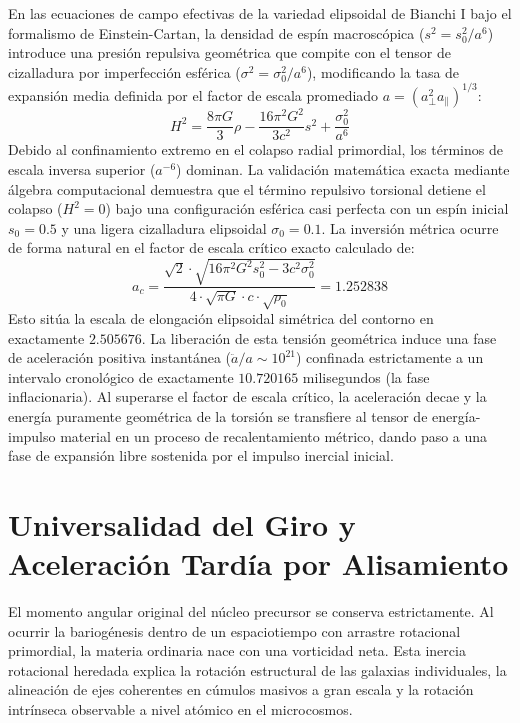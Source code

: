 \documentclass[11pt,a4paper]{article}
\begin{document}
En las ecuaciones de campo efectivas de la variedad elipsoidal de Bianchi I bajo el formalismo de Einstein-Cartan, la densidad de espín macroscópica ($s^2 = s_0^2/a^6$) introduce una presión repulsiva geométrica que compite con el tensor de cizalladura por imperfección esférica ($\sigma^2 = \sigma_0^2/a^6$), modificando la tasa de expansión media definida por el factor de escala promediado $a = (a_{\perp}^2 a_{\parallel})^{1/3}$:
\begin{equation}
H^2 = \frac{8\pi G}{3}\rho - \frac{16\pi^2 G^2}{3c^2}s^2 + \frac{\sigma_0^2}{a^6}
\end{equation}
Debido al confinamiento extremo en el colapso radial primordial, los términos de escala inversa superior ($a^{-6}$) dominan. La validación matemática exacta mediante álgebra computacional demuestra que el término repulsivo torsional detiene el colapso ($H^2 = 0$) bajo una configuración esférica casi perfecta con un espín inicial $s_0 = 0.5$ y una ligera cizalladura elipsoidal $\sigma_0 = 0.1$. La inversión métrica ocurre de forma natural en el factor de escala crítico exacto calculado de:
\begin{equation}
a_c = \frac{\sqrt{2} \cdot \sqrt{16\pi^2 G^2 s_0^2 - 3c^2 \sigma_0^2}}{4 \cdot \sqrt{\pi G} \cdot c \cdot \sqrt{\rho_0}} = 1.252838
\end{equation}
Esto sitúa la escala de elongación elipsoidal simétrica del contorno en exactamente $2.505676$. La liberación de esta tensión geométrica induce una fase de aceleración positiva instantánea ($\ddot{a}/a \sim 10^{21}$) confinada estrictamente a un intervalo cronológico de exactamente $10.720165$ milisegundos (la fase inflacionaria). Al superarse el factor de escala crítico, la aceleración decae y la energía puramente geométrica de la torsión se transfiere al tensor de energía-impulso material en un proceso de recalentamiento métrico, dando paso a una fase de expansión libre sostenida por el impulso inercial inicial.

\section{Universalidad del Giro y Aceleración Tardía por Alisamiento}
El momento angular original del núcleo precursor se conserva estrictamente. Al ocurrir la bariogénesis dentro de un espaciotiempo con arrastre rotacional primordial, la materia ordinaria nace con una vorticidad neta. Esta inercia rotacional heredada explica la rotación estructural de las galaxias individuales, la alineación de ejes coherentes en cúmulos masivos a gran escala y la rotación intrínseca observable a nivel atómico en el microcosmos.
\end{document}
